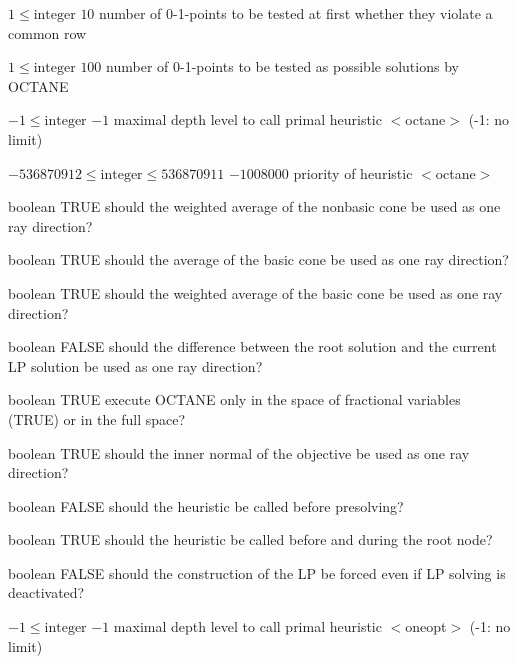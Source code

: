 %
{$1\leq\textrm{integer}$}%
{$10$}%
{number of 0-1-points to be tested at first whether they violate a common row}%
{}

%
{$1\leq\textrm{integer}$}%
{$100$}%
{number of 0-1-points to be tested as possible solutions by OCTANE}%
{}

%
{$-1\leq\textrm{integer}$}%
{$-1$}%
{maximal depth level to call primal heuristic $<$octane$>$ (-1: no limit)}%
{}

%
{$-536870912\leq\textrm{integer}\leq536870911$}%
{$-1008000$}%
{priority of heuristic $<$octane$>$}%
{}

%
{boolean}%
{TRUE}%
{should the weighted average of the nonbasic cone be used as one ray direction?}%
{}

%
{boolean}%
{TRUE}%
{should the average of the basic cone be used as one ray direction?}%
{}

%
{boolean}%
{TRUE}%
{should the weighted average of the basic cone be used as one ray direction?}%
{}

%
{boolean}%
{FALSE}%
{should the difference between the root solution and the current LP solution be used as one ray direction?}%
{}

%
{boolean}%
{TRUE}%
{execute OCTANE only in the space of fractional variables (TRUE) or in the full space?}%
{}

%
{boolean}%
{TRUE}%
{should the inner normal of the objective be used as one ray direction?}%
{}

%
{boolean}%
{FALSE}%
{should the heuristic be called before presolving?}%
{}

%
{boolean}%
{TRUE}%
{should the heuristic be called before and during the root node?}%
{}

%
{boolean}%
{FALSE}%
{should the construction of the LP be forced even if LP solving is deactivated?}%
{}

%
{$-1\leq\textrm{integer}$}%
{$-1$}%
{maximal depth level to call primal heuristic $<$oneopt$>$ (-1: no limit)}%
{}


